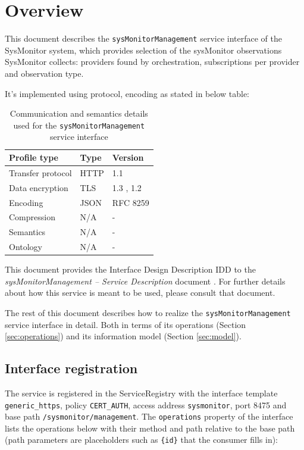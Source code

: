 \documentclass[a4paper]{arrowhead}
\begin{document}
\section{Overview}
\label{sec:overview}

This document describes the \texttt{sys\allowbreak{}Monitor\allowbreak{}Management} service interface of the SysMonitor system, which provides selection of the sysMonitor observations SysMonitor collects: providers found by orchestration, subscriptions per provider and observation type.

It's implemented using protocol, encoding as stated in below table:
\begin{table}[ht!]
  \centering
  \begin{tabular}{|l|l|l|}
    \hline
    \rowcolor{gray!33} Profile type & Type & Version \\ \hline
    Transfer protocol & HTTP & 1.1 \cite{rfc9112} \\ \hline
    Data encryption & TLS & 1.3 \cite{rfc8446}, 1.2 \cite{rfc5246} \\ \hline
    Encoding & JSON & RFC 8259 \cite{rfc8259} \\ \hline
    Compression & N/A & - \\ \hline
    Semantics & N/A & - \\ \hline
    Ontology & N/A & - \\ \hline
  \end{tabular}
  \caption{Communication and semantics details used for the \texttt{sys\allowbreak{}Monitor\allowbreak{}Management} service interface}
  \label{tab:comunication_semantics_profile}
\end{table}

This document provides the Interface Design Description IDD to the \textit{sysMonitorManagement -- Service Description} document \cite{smo-sysMonitorManagement-sd}.
For further details about how this service is meant to be used, please consult that document.

The rest of this document describes how to realize the \texttt{sys\allowbreak{}Monitor\allowbreak{}Management} service
interface in detail. Both in terms of its operations (Section \ref{sec:operations}) and its information model (Section \ref{sec:model}).

\subsection{Interface registration}

The service is registered in the ServiceRegistry with the interface template \texttt{generic\_\allowbreak{}https}, policy \texttt{CERT\_\allowbreak{}AUTH}, access address \texttt{sysmonitor}, port 8475 and base path \texttt{/\allowbreak{}sysmonitor/\allowbreak{}management}. The \texttt{operations} property of the interface lists the operations below with their method and path relative to the base path (path parameters are placeholders such as \texttt{\{id\}} that the consumer fills in):
\end{document}
